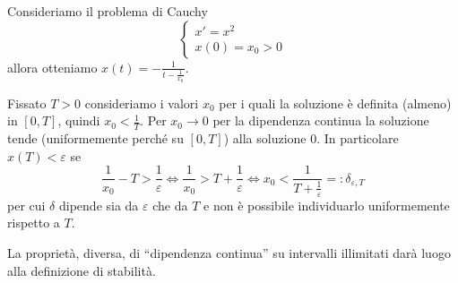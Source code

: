 \begin{remark}
    Consideriamo il problema di Cauchy
    \[
        \begin{cases}
            x' = x^2 \\
            x{(0)} = x_{0} > 0
        \end{cases}
    \]
    allora otteniamo \( \displaystyle x{(t)} = - \frac{1}{t-\frac{1}{x_{0}}}\).

    Fissato \(T > 0\) consideriamo i valori \(x_{0}\) per i quali la soluzione è
    definita (almeno) in \([0, T]\), quindi \(x_{0} < \frac{1}{T}\). Per \(x_{0}
    \to 0\) per la dipendenza continua la soluzione tende (uniformemente perché
    su \([0, T]\)) alla soluzione 0. In particolare \(x{(T)} < \varepsilon\) se 
    \[
        \frac{1}{x_{0}} - T > \frac{1}{\varepsilon} \iff \frac{1}{x_{0}} > T +
        \frac{1}{\varepsilon} \iff x_{0} < \frac{1}{T + \frac{1}{\varepsilon}}
        =: \delta_{\varepsilon, T} 
    \]
    per cui \(\delta\) dipende sia da \(\varepsilon\) che da \(T\) e non è
    possibile individuarlo uniformemente rispetto a \(T\).

    La proprietà, diversa, di ``dipendenza continua'' su intervalli illimitati
    darà luogo alla definizione di stabilità.
\end{remark}

